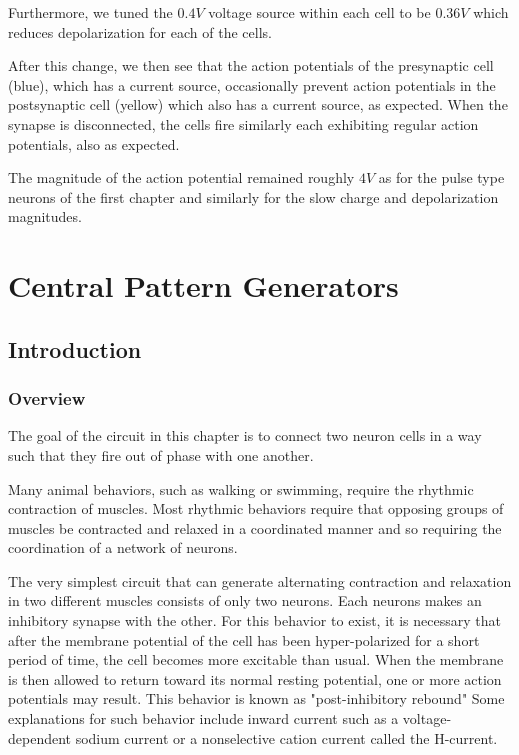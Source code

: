 \documentclass[12]{book}
\newcommand\0{\mathbf{0}}
\newcommand\<{\langle}
\renewcommand\>{\rangle}
\begin{document}
Furthermore, we tuned the $0.4 V$ voltage source within each cell to be $0.36 V$ which reduces depolarization for each of the cells. 

After this change, we then see that the action potentials of the presynaptic cell (blue), which has a current source, occasionally prevent action potentials in the postsynaptic cell (yellow) which also has a current source, as expected. When the synapse is disconnected, the cells fire similarly each exhibiting regular action potentials, also as expected.

The magnitude of the action potential remained roughly $4V$ as for the pulse type neurons of the first chapter and similarly for the slow charge and depolarization magnitudes. 
\chapter{Central Pattern Generators}

\section{Introduction}

\subsection{Overview}

The goal of the circuit in this chapter is to connect two neuron cells in a way such that they fire out of phase with one another.

Many animal behaviors, such as walking or swimming, require the rhythmic contraction of muscles. Most rhythmic behaviors require that opposing groups of muscles be contracted and relaxed in a coordinated manner and so requiring the coordination of a network of neurons.

The very simplest circuit that can generate alternating contraction and relaxation in two different muscles consists of only two neurons. Each neurons makes an inhibitory synapse with the other. For this behavior to exist, it is necessary that after the membrane potential of the cell has been hyper-polarized for a short period of time, the cell becomes more excitable than usual. When the membrane is then allowed to return toward its normal resting potential, one or more action potentials may result. This behavior is known as "post-inhibitory rebound" Some explanations for such behavior include inward current such as a voltage-dependent sodium current or a nonselective cation current called the H-current.
\end{document}
